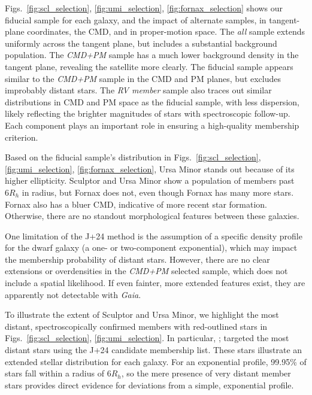 Figs.~\ref{fig:scl_selection}, \ref{fig:umi_selection}, \ref{fig:fornax_selection}
shows our fiducial sample for each galaxy, and the impact of alternate
samples, in tangent-plane coordinates, the CMD, and in proper-motion
space. The \emph{all} sample extends uniformly across the tangent plane,
but includes a substantial background population. The \emph{CMD+PM}
sample has a much lower background density in the tangent plane,
revealing the satellite more clearly. The fiducial sample appears
similar to the \emph{CMD+PM} sample in the CMD and PM planes, but
excludes improbably distant stars. The \emph{RV member} sample also
traces out similar distributions in CMD and PM space as the fiducial
sample, with less dispersion, likely reflecting the brighter magnitudes
of stars with spectroscopic follow-up. Each component plays an important
role in ensuring a high-quality membership criterion.

Based on the fiducial sample's distribution in
Figs.~\ref{fig:scl_selection}, \ref{fig:umi_selection}, \ref{fig:fornax_selection},
Ursa Minor stands out because of its higher ellipticity. Sculptor and
Ursa Minor show a population of members past \(6R_h\) in radius, but
Fornax does not, even though Fornax has many more stars. Fornax also has
a bluer CMD, indicative of more recent star formation. Otherwise, there
are no standout morphological features between these galaxies.

One limitation of the J+24 method is the assumption of a specific
density profile for the dwarf galaxy (a one- or two-component
exponential), which may impact the membership probability of distant
stars. However, there are no clear extensions or overdensities in the
\emph{CMD+PM} selected sample, which does not include a spatial
likelihood. If even fainter, more extended features exist, they are
apparently not detectable with \emph{Gaia}.

To illustrate the extent of Sculptor and Ursa Minor, we highlight the
most distant, spectroscopically confirmed members with red-outlined
stars in Figs.~\ref{fig:scl_selection}, \ref{fig:umi_selection}. In
particular, \citet{sestito+2023a}; \citet{sestito+2023b} targeted the
most distant stars using the J+24 candidate membership list. These stars
illustrate an extended stellar distribution for each galaxy. For an
exponential profile, 99.95\% of stars fall within a radius of \(6R_h\),
so the mere presence of very distant member stars provides direct
evidence for deviations from a simple, exponential profile.

